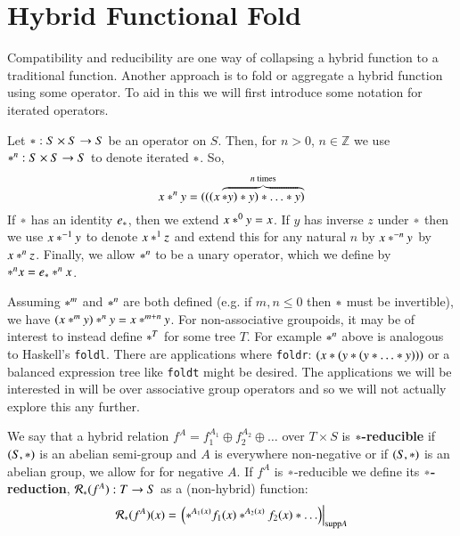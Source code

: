 \section{Hybrid Functional Fold}


Compatibility and reducibility are one way of collapsing a hybrid function to a traditional function.
Another approach is to fold or aggregate a hybrid function using some operator.
To aid in this we will first introduce some notation for iterated operators.
\begin{definition}
	Let $* : S \times S \to S$ be an operator on $S$.
	Then, for $n > 0$, $n \in \mathbb{Z}$ we use $*^n:S \times S \to S$ to denote iterated $*$.
	So,
	\begin{equation}
		x *^n y = (((x \overbrace{* y) * y) * \ldots * y)}^{n \text{ times}}
	\end{equation}
	If $*$ has an identity $e_*$, then we extend $x *^0 y = x$.
	If $y$ has inverse $z$ under $*$ then we use $x *^{-1} y$ to denote $x *^1 z$
	and extend this for any natural $n$ by $x *^{-n} y$ by  $x *^{n} z$.
	Finally, we allow $*^n$ to be a unary operator, which we define by $*^n x = e_* *^n x$.
\end{definition}

Assuming $*^m$ and $*^n$ are both defined (e.g. if $m,n \leq 0$ then $*$ must be invertible),
we have $ ( x *^m y ) *^n y = x *^{m+n} y$.
For non-associative groupoids, it may be of interest to instead define $*^T$ for some tree $T$. 
For example $*^n$ above is analogous to Haskell's \texttt{foldl}.
There are applications where \texttt{foldr}: $(x * ( y * ( y * \ldots * y)))$ or a balanced expression tree like \texttt{foldt} might be desired.
The applications we will be interested in will be over associative group operators and so we will not actually 
explore this any further.

\begin{definition}
	We say that a hybrid relation $f^A = f_1^{A_1} \oplus f_2^{A_2} \oplus \ldots$ over $T \times S$ 
	is $*$\textbf{-reducible} if $(S, *)$ is an abelian semi-group and $A$ is everywhere non-negative
	or if $(S, *)$ is an abelian group, we allow for for negative $A$.
	If $f^A$ is $*$-reducible we define its $*$\textbf{-reduction}, $\mathcal{R}_*(f^A) :  T \to S$ 
	as a (non-hybrid) function:
	\begin{equation}
		\mathcal{R}_* (f^A)(x) = \left.\left(*^{A_1(x)} f_1(x) *^{A_2(x)} f_2(x) * \ldots \right)\right|_{\text{supp} A}
	\end{equation}
\end{definition}


